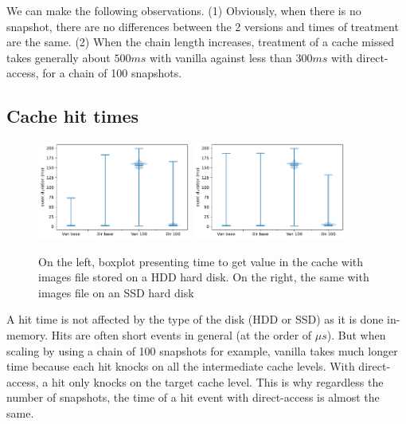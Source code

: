 \documentclass[sigplan,screen,10pt]{acmart}
\begin{document}
	We can make the following observations.
	(1) Obviously, when there is no snapshot, there are no differences between the 2 versions and times of treatment are the same.
	(2) When the chain length increases, treatment of a cache missed takes generally about $500 ms$ with vanilla against less than $300 ms$ with direct-access, for a chain of 100 snapshots.
	
	\subsection*{Cache hit times}
	
	\begin{figure}[h]
		\center
		\includegraphics[width=0.45\textwidth]{HIT_time_hdd.pdf}
		\includegraphics[width=0.45\textwidth]{HIT_time_ssd.pdf}
		\caption{On the left, boxplot presenting time to get value in the cache with images file stored on a HDD hard disk. On the right, the same with images file on an SSD hard disk}
		\label{fig:fig_b}
	\end{figure}

	A hit time is not affected by the type of the disk (HDD or SSD) as it is done in-memory.
	Hits are often short events in general (at the order of $\mu s$). 
	But when scaling by using a chain of 100 snapshots for example, vanilla takes much longer time because each hit knocks on all the intermediate cache levels.
	With direct-access, a hit only knocks on the target cache level. 
	This is why regardless the number of snapshots, the time of a hit event with direct-access is almost the same.
\end{document}
